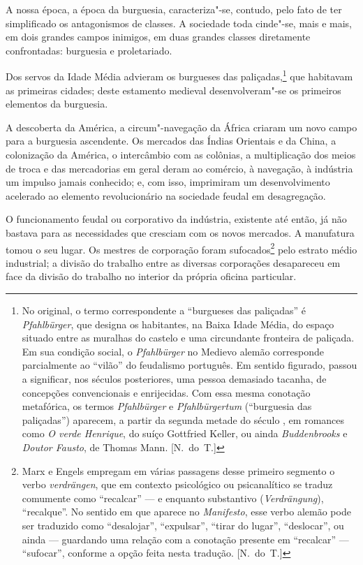 A nossa época, a época da burguesia, caracteriza"-se, contudo, pelo
fato de ter simplificado os antagonismos de classes. A sociedade toda
cinde"-se, mais e mais, em dois grandes campos inimigos, em duas			\label{1}
grandes classes diretamente confrontadas: burguesia e proletariado.

Dos servos da Idade Média advieram os burgueses das   
paliçadas,\footnote{ No original, o termo correspondente a “burgueses das paliçadas” é    \label{8}
\textit{Pfahlbürger}, que designa os habitantes, na Baixa Idade Média,
do espaço situado entre as muralhas do castelo e uma circundante
fronteira de paliçada. Em sua condição social, o \textit{Pfahlbürger}
no Medievo alemão corresponde parcialmente ao “vilão” do feudalismo
português. Em sentido figurado, passou a significar, nos séculos
posteriores, uma pessoa demasiado tacanha, de concepções convencionais
e enrijecidas. Com essa mesma conotação metafórica, os termos
\textit{Pfahlbürger} e \textit{Pfahlbürgertum} (“burguesia das
paliçadas”) aparecem, a partir da segunda metade do século , em
romances como \textit{O verde Henrique}, do suíço Gottfried Keller, ou
ainda \textit{Buddenbrooks} e \textit{Doutor Fausto}, de Thomas
Mann. [N.~do~T.]}
que habitavam as primeiras cidades; deste estamento medieval 
desenvolveram"-se os primeiros elementos da burguesia.

A descoberta da América, a circum"-navegação da África criaram um novo
campo para a burguesia ascendente. Os mercados das Índias Orientais e
da China, a colonização da América, o intercâmbio com as colônias, a
multiplicação dos meios de troca e das mercadorias em geral deram ao
comércio, à navegação, à indústria um impulso jamais conhecido; e, com
isso, imprimiram um desenvolvimento acelerado ao elemento
revolucionário na sociedade feudal em desagregação.

O funcionamento feudal ou corporativo da indústria, existente
até então, já não bastava para as necessidades que cresciam com os
novos mercados. A manufatura tomou o seu lugar. Os mestres de
corporação foram sufocados\footnote{ Marx e Engels empregam em várias passagens 
desse primeiro segmento o verbo \textit{verdrängen}, que em contexto psicológico 
ou psicanalítico se traduz comumente como ``recalcar''  ---  e enquanto
substantivo (\textit{Verdrängung}), ``recalque''. No sentido em que aparece 
no \textit{Manifesto}, esse verbo alemão pode ser traduzido como
``desalojar'', ``expulsar'', ``tirar do lugar'', ``deslocar'',  ou ainda  --- 
guardando uma relação com a conotação presente em ``recalcar''  --- 
``sufocar'', conforme a opção feita nesta tradução. [N.~do~T.]}
pelo estrato médio industrial; a divisão do trabalho entre as
diversas corporações desapareceu em face da divisão do trabalho no
interior da própria oficina particular.


